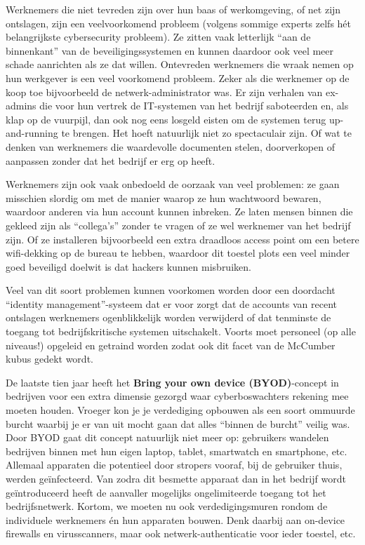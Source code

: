 \documentclass[
  10pt,
  dutch,
  paper=a4,
  ,captions=tableheading
]{scrbook}
\begin{document}
Werknemers die niet tevreden zijn over hun baas of werkomgeving, of net
zijn ontslagen, zijn een veelvoorkomend probleem (volgens sommige
experts zelfs hét belangrijkste cybersecurity probleem). Ze zitten vaak
letterlijk ``aan de binnenkant'' van de beveiligingssystemen en kunnen
daardoor ook veel meer schade aanrichten als ze dat willen. Ontevreden
werknemers die wraak nemen op hun werkgever is een veel voorkomend
probleem. Zeker als die werknemer op de koop toe bijvoorbeeld de
netwerk-administrator was. Er zijn verhalen van ex-admins die voor hun
vertrek de IT-systemen van het bedrijf saboteerden en, als klap op de
vuurpijl, dan ook nog eens losgeld eisten om de systemen terug
up-and-running te brengen. Het hoeft natuurlijk niet zo spectaculair
zijn. Of wat te denken van werknemers die waardevolle documenten stelen,
doorverkopen of aanpassen zonder dat het bedrijf er erg op heeft.

Werknemers zijn ook vaak onbedoeld de oorzaak van veel problemen: ze
gaan misschien slordig om met de manier waarop ze hun wachtwoord
bewaren, waardoor anderen via hun account kunnen inbreken. Ze laten
mensen binnen die gekleed zijn als ``collega's'' zonder te vragen of ze
wel werknemer van het bedrijf zijn. Of ze installeren bijvoorbeeld een
extra draadloos access point om een betere wifi-dekking op de bureau te
hebben, waardoor dit toestel plots een veel minder goed beveiligd
doelwit is dat hackers kunnen misbruiken.

\begin{tipblock}
Veel van dit soort problemen kunnen voorkomen worden door een doordacht
``identity management''-systeem dat er voor zorgt dat de accounts van
recent ontslagen werknemers ogenblikkelijk worden verwijderd of dat
tenminste de toegang tot bedrijfskritische systemen uitschakelt. Voorts
moet personeel (op alle niveaus!) opgeleid en getraind worden zodat ook
dit facet van de McCumber kubus gedekt wordt.
\end{tipblock}

De laatste tien jaar heeft het \textbf{Bring your own device
(BYOD)}-concept in bedrijven voor een extra dimensie gezorgd waar
cyberboswachters rekening mee moeten houden. Vroeger kon je je
verdediging opbouwen als een soort ommuurde burcht waarbij je er van uit
mocht gaan dat alles ``binnen de burcht'' veilig was. Door BYOD gaat dit
concept natuurlijk niet meer op: gebruikers wandelen bedrijven binnen
met hun eigen laptop, tablet, smartwatch en smartphone, etc. Allemaal
apparaten die potentieel door stropers vooraf, bij de gebruiker thuis,
werden geïnfecteerd. Van zodra dit besmette apparaat dan in het bedrijf
wordt geïntroduceerd heeft de aanvaller mogelijks ongelimiteerde toegang
tot het bedrijfsnetwerk. Kortom, we moeten nu ook verdedigingsmuren
rondom de individuele werknemers én hun apparaten bouwen. Denk daarbij
aan on-device firewalls en virusscanners, maar ook netwerk-authenticatie
voor ieder toestel, etc.
\end{document}
